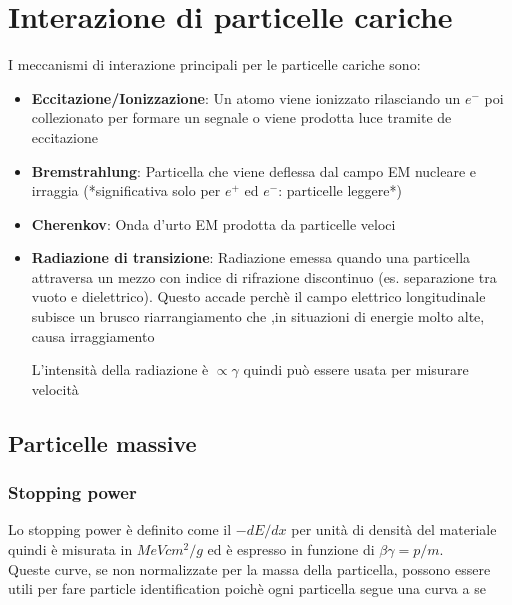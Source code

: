 \section{Interazione di particelle cariche}
I meccanismi di interazione principali per le particelle cariche sono:
\begin{itemize}

    \item \textbf{Eccitazione/Ionizzazione}: Un atomo viene ionizzato rilasciando un $e^-$ poi collezionato per formare un segnale o viene prodotta luce tramite de eccitazione

    \item \textbf{Bremstrahlung}: Particella che viene deflessa dal campo EM nucleare e irraggia (*significativa solo per $e^+$ ed $e^{-}$: particelle leggere*)

    \item \textbf{Cherenkov}: Onda d'urto EM prodotta da particelle veloci

    \item \textbf{Radiazione di transizione}: Radiazione emessa quando una particella attraversa un mezzo con indice di rifrazione discontinuo (es. separazione tra vuoto e dielettrico). Questo accade perchè il campo elettrico longitudinale subisce un brusco riarrangiamento che ,in situazioni di energie molto alte, causa irraggiamento

    L'intensità della radiazione è $\propto \gamma$ quindi può essere usata per misurare velocità

\end{itemize}
\subsection*{Particelle massive}
    \subsubsection*{Stopping power}
        Lo stopping power è definito come il $-dE/dx$ per unità di densità del materiale quindi è misurata in $MeV cm^2/g$  ed è espresso in funzione di $\beta \gamma=p/m$.
        \\
        Queste curve, se non normalizzate per la massa della particella, possono essere utili per fare particle identification poichè ogni particella segue una curva a se

